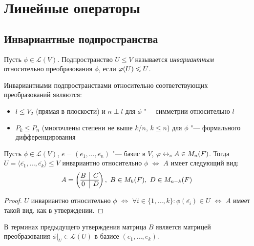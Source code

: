 \section{Линейные операторы}

\subsection{Инвариантные подпространства}

\begin{definition}
	Пусть $\phi \in \mathcal{L}(V)$. Подпространство $U \le V$ называется \textit{инвариантным} относительно преобразования $\phi$, если $\phi(U) \hm{\le} U$.
\end{definition}

\begin{example}
	Инвариантными подпространствами относительно соответствующих преобразований являются:
	\begin{itemize}
		\item $l \le V_2$ (прямая в плоскости) и $n \perp l$ для $\phi$ "--- симметрии относительно $l$
		\item $P_k \le P_n$ (многочлены степени не выше $k$/$n$, $k \le n$) для $\phi$ "--- формального дифференцирования
	\end{itemize}
\end{example}

\begin{proposition}
	Пусть $\phi \in \mathcal{L}(V)$, $e = (\overline{e_1}, \dots, \overline{e_n})$ "--- базис в $V$, $\phi \leftrightarrow_e A \hm{\in} M_n(F)$. Тогда $U = \langle\overline{e_1}, \dots, \overline{e_k}\rangle \le V$ инвариантно относительно $\phi$ $\Leftrightarrow$ $A$ имеет следующий вид:
	\[A = \left(\begin{array}{@{}c|c@{}}
	B & C\\
	\hline
	0 & D
	\end{array}\right),~B \in M_k(F),~D \in M_{n - k}(F)\]
\end{proposition}

\begin{proof}
	$U$ инвариантно относительно $\phi$ $\Leftrightarrow$ $\forall i \in \{1, \dots, k\}: \phi(\overline{e_i}) \in U$ $\Leftrightarrow$ $A$ имеет такой вид, как в утверждении.
\end{proof}

\begin{note}
	В терминах предыдущего утверждения матрица $B$ является матрицей преобразования $\phi|_U \in \mathcal{L}(U)$ в базисе $(\overline{e_1}, \dots, \overline{e_k})$.
\end{note}

